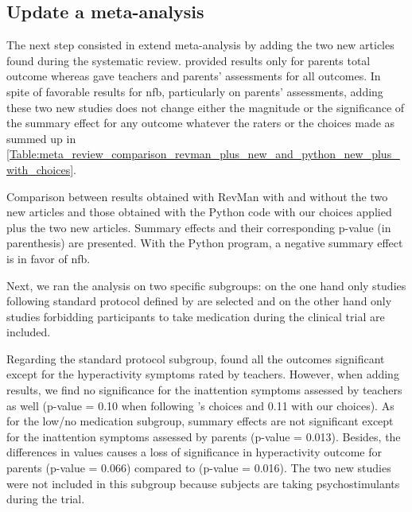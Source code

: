 \subsection{Update a meta-analysis}

The next step consisted in extend \citet{Cortese2016} meta-analysis by adding the two new articles \citep{Strehl2017, Baumeister2016} found 
during the systematic review. \citet{Baumeister2016} provided results only for parents total outcome whereas \citet{Strehl2017} gave teachers 
and parents' assessments for all outcomes. In spite of favorable results for \gls{nfb}, particularly on parents' assessments, adding these two 
new studies does not change either the magnitude or the significance of the summary effect for any outcome whatever the raters or the choices made 
as summed up in \cref{Table:meta_review_comparison_revman_plus_new_and_python_new_plus_with_choices}.
 
\clearpage
\begin{landscape}
\begin{table}[h!]
\centering
\caption{Comparison between \citet{Cortese2016} results obtained with RevMan \citep{RevMan} with and without the two new articles and 
those obtained with the Python code with our choices applied plus the two new articles. Summary effects and their corresponding p-value 
(in parenthesis) are presented. With the Python program, a negative summary effect is in favor of \gls{nfb}.}
 
  \label{Table:meta_review_comparison_revman_plus_new_and_python_new_plus_with_choices}
\end{table}
\end{landscape}

Next, we ran the analysis on two specific subgroups: on the one hand only studies following standard protocol defined by \citet{Arns2014}
are selected and on the other hand only studies forbidding participants to take medication during the clinical trial are included. 

Regarding the standard protocol subgroup, \citet{Cortese2016} found all the outcomes significant except for the hyperactivity symptoms 
rated by teachers. However, when adding \citep{Strehl2017} results, we find no significance for the inattention symptoms assessed by 
teachers as well (p-value = 0.10 when following \citeauthor{Cortese2016}'s choices and 0.11 with our choices). 
As for the low/no medication subgroup, summary effects are not significant except for the inattention symptoms assessed by parents (p-value = 0.013). 
Besides, the differences in \citet{Arnold2014} values causes a loss of significance in 
hyperactivity outcome for parents (p-value = 0.066) compared to \citet{Cortese2016} (p-value = 0.016). The two new studies were not included in this subgroup because 
subjects are taking psychostimulants during the trial.

